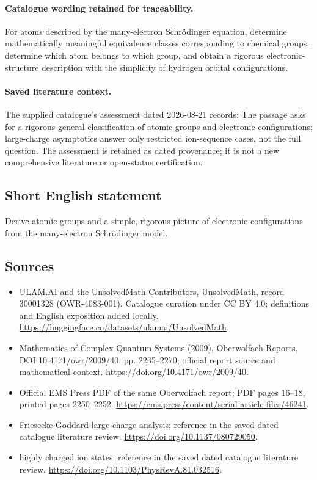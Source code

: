 \documentclass[11pt]{article}
\begin{document}
\paragraph{Catalogue wording retained for traceability.}
For atoms described by the many-electron Schrödinger equation, determine mathematically meaningful equivalence classes corresponding to chemical groups, determine which atom belongs to which group, and obtain a rigorous electronic-structure description with the simplicity of hydrogen orbital configurations.

\paragraph{Saved literature context.} The supplied catalogue's assessment dated 2026-08-21 records: The passage asks for a rigorous general classification of atomic groups and electronic configurations; large-charge asymptotics answer only restricted ion-sequence cases, not the full question. The assessment is retained as dated provenance; it is not a new comprehensive literature or open-status certification.
\subsection{Short English statement}
Derive atomic groups and a simple, rigorous picture of electronic configurations from the many-electron Schrödinger model.
\subsection{Sources}
\begin{itemize}
\item[\hypertarget{source:30001328:1}{S1}] ULAM.AI and the UnsolvedMath Contributors, UnsolvedMath, record 30001328 (OWR-4083-001). Catalogue curation under CC BY 4.0; definitions and English exposition added locally.
\url{https://huggingface.co/datasets/ulamai/UnsolvedMath}.
\item[\hypertarget{source:30001328:2}{S2}] Mathematics of Complex Quantum Systems (2009), Oberwolfach Reports, DOI 10.4171/owr/2009/40, pp. 2235--2270; official report source and mathematical context.
\url{https://doi.org/10.4171/owr/2009/40}.
\item[\hypertarget{source:30001328:3}{S3}] Official EMS Press PDF of the same Oberwolfach report; PDF pages 16--18, printed pages 2250--2252.
\url{https://ems.press/content/serial-article-files/46241}.
\item[\hypertarget{source:30001328:4}{S4}] Friesecke-Goddard large-charge analysis; reference in the saved dated catalogue literature review.
\url{https://doi.org/10.1137/080729050}.
\item[\hypertarget{source:30001328:5}{S5}] highly charged ion states; reference in the saved dated catalogue literature review.
\url{https://doi.org/10.1103/PhysRevA.81.032516}.
\end{itemize}
\label{end:30001328}
\end{document}
